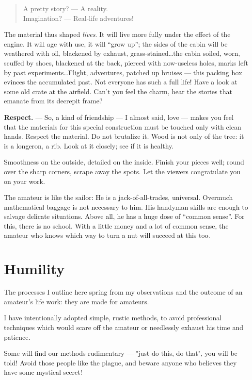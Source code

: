 \documentclass{book}
\begin{document}
\begin{verse}
  A pretty story? --- A reality.\\
  Imagination? --- Real-life adventures!
\end{verse}

The material thus shaped \textit{lives}. It will live more fully under
the effect of the engine. It will age with use, it will ``grow up'';
the sides of the cabin will be weathered with oil, blackened by
exhaust, grass-stained\ldots the cabin soiled, worn, scuffed by shoes,
blackened at the back, pierced with now-useless holes, marks left by
past experiments\ldots Flight, adventures, patched up bruises --- this
packing box evinces the accumulated past. Not everyone has such a full
life! Have a look at some old crate at the airfield. Can't you feel
the charm, hear the stories that emanate from its decrepit frame?

\textbf{Respect.} --- So, a kind of friendship --- I almost said, love
--- makes you feel that the materials for this special construction
must be touched only with clean hands. Respect the material. Do not
brutalize it.  Wood is not only of the tree: it is a longeron, a
rib. Look at it closely; see if it is healthy.

Smoothness on the outside, detailed on the inside. Finish your pieces
well; round over the sharp corners, scrape away the spots.  Let the
viewers congratulate you on your work.

The amateur is like the sailor: He is a jack-of-all-trades,
universal. Overmuch mathematical baggage is not necessary to him. His
handyman skills are enough to salvage delicate situations. Above all,
he has a huge dose of ``common sense''. For this, there is no
school. With a little money and a lot of common sense, the amateur who
knows which way to turn a nut will succeed at this too.

\section{Humility}

The processes I outline here spring from my observations and the
outcome of an amateur's life work: they are made for amateurs.

I have intentionally adopted simple, rustic methods, to avoid
professional techniques which would scare off the amateur or
needlessly exhaust his time and patience.

Some will find our methods rudimentary --- "just do this, do that",
you will be told!  Avoid those people like the plague, and beware
anyone who believes they have some mystical secret!
\end{document}
